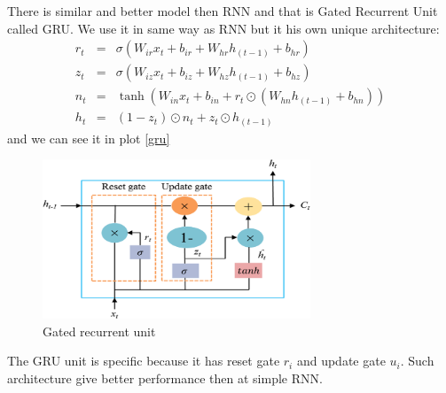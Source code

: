 There is similar and better model then RNN and that is Gated Recurrent Unit called GRU.
We use it in same way as RNN but it his own unique architecture\cite{gru}:
\begin{eqnarray}
	r_t &=& \sigma(W_{ir} x_t + b_{ir} + W_{hr} h_{(t-1)} + b_{hr}) \\
	z_t &=& \sigma(W_{iz} x_t + b_{iz} + W_{hz} h_{(t-1)} + b_{hz}) \\
	n_t &=& \tanh(W_{in} x_t + b_{in} + r_t \odot (W_{hn} h_{(t-1)}+ b_{hn})) \\
	h_t &=& (1 - z_t) \odot n_t + z_t \odot h_{(t-1)}
\end{eqnarray} and we can see it in plot \ref{gru}
\begin{figure}[h!]
	\centering\includegraphics[width=8cm]{chapters/chapter2/gru}
	\caption{Gated recurrent unit\cite{gru_picture}}
	\label{gnn}
\end{figure}
The GRU unit is specific because it has reset gate $r_i$ and update gate $u_i$. Such architecture give better performance then at simple RNN.

